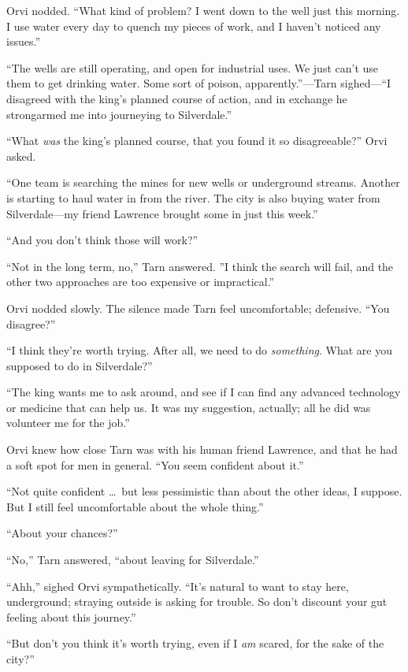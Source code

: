 Orvi nodded.  ``What kind of problem? I went down to the well just this morning.  I use water every day to quench my pieces of work, and I haven't noticed any issues.''

``The wells are still operating, and open for industrial uses.  We just can't use them to get drinking water.  Some sort of poison, apparently.''---Tarn sighed---``I disagreed with the king's planned course of action, and in exchange he strongarmed me into journeying to Silverdale.''

``What \emph{was} the king's planned course, that you found it so disagreeable?'' Orvi asked.

``One team is searching the mines for new wells or underground streams.  Another is starting to haul water in from the river.  The city is also buying water from Silverdale---my friend Lawrence brought some in just this week.''

``And you don't think those will work?''

``Not in the long term, no,'' Tarn answered.  ''I think the search will fail, and the other two approaches are too expensive or impractical.''

Orvi nodded slowly.  The silence made Tarn feel uncomfortable; defensive.  ``You disagree?''

``I think they're worth trying.  After all, we need to do \emph{something}.  What are you supposed to do in Silverdale?''

``The king wants me to ask around, and see if I can find any advanced technology or medicine that can help us.  It was my suggestion, actually; all he did was volunteer me for the job.''

Orvi knew how close Tarn was with his human friend Lawrence, and that he had a soft spot for men in general.  ``You seem confident about it.''

``Not quite confident \ldots\ but less pessimistic than about the other ideas, I suppose.  But I still feel uncomfortable about the whole thing.''

``About your chances?''

``No,'' Tarn answered, ``about leaving for Silverdale.''

``Ahh,'' sighed Orvi sympathetically.  ``It's natural to want to stay here, underground; straying outside is asking for trouble.  So don't discount your gut feeling about this journey.''

``But don't you think it's worth trying, even if I \emph{am} scared, for the sake of the city?''

